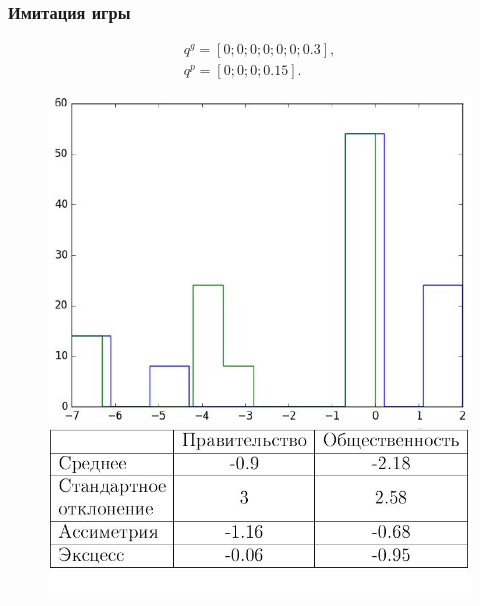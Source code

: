\documentclass {beamer}
\begin{document}
\begin{frame}
	\frametitle{Имитация игры}
 \begin{gather*}
 q^g = \left[ 0; 0; 0; 0; 0; 0; 0.3 \right], \\
 q^p = \left[ 0; 0; 0; 0.15 \right].
 \end{gather*}
	
	\begin{figure}
		\begin{minipage}[b]{0.45\textwidth}
			
			\includegraphics[width=\textwidth]{10th}
		\end{minipage}
		\begin{minipage}[b]{0.45\textwidth}
			
			\includegraphics[width=\textwidth]{11th}
		\end{minipage}
		
	\end{figure}
	
\end{frame}
\end{document}
